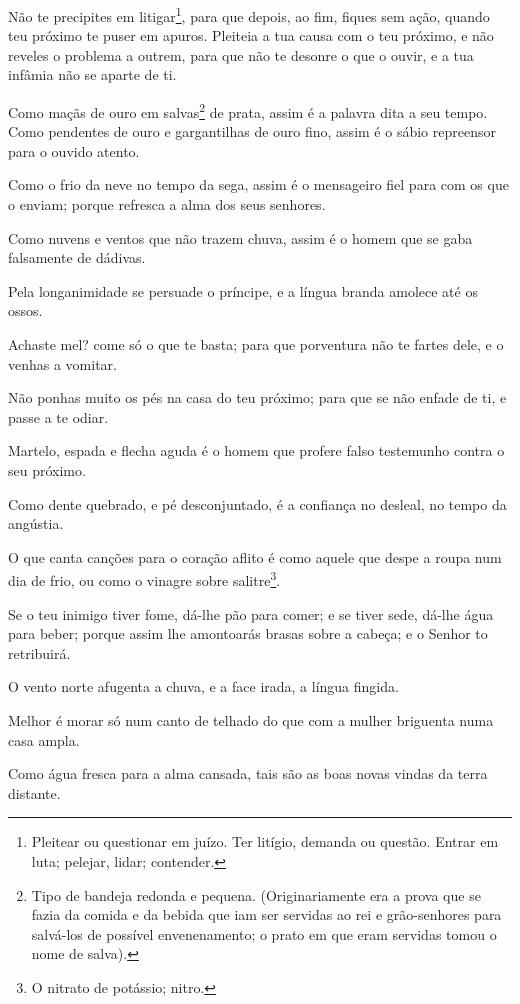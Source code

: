Não te precipites em litigar\footnote{Pleitear ou questionar em
juízo. Ter litígio, demanda ou questão. Entrar em luta; pelejar,
lidar; contender.}, para que depois, ao fim, fiques sem ação, quando
teu próximo te puser em apuros. Pleiteia a tua causa com o teu
próximo, e não reveles o problema a outrem, para que não te
desonre o que o ouvir, e a tua infâmia não se aparte de ti.

Como maçãs de ouro em salvas\footnote{Tipo de bandeja redonda e
pequena. (Originariamente era a prova que se fazia da comida e da
bebida que iam ser servidas ao rei e grão-senhores para salvá-los de
possível envenenamento; o prato em que eram servidas tomou o nome de
salva).} de prata, assim é a palavra dita a seu tempo. Como
pendentes de ouro e gargantilhas de ouro fino, assim é o sábio
repreensor para o ouvido atento.

Como o frio da neve no tempo da sega, assim é o mensageiro fiel
para com os que o enviam; porque refresca a alma dos seus senhores.

Como nuvens e ventos que não trazem chuva, assim é o homem que se
gaba falsamente de dádivas.

Pela longanimidade se persuade o príncipe, e a língua branda
amolece até os ossos.

Achaste mel? come só o que te basta; para que porventura não te
fartes dele, e o venhas a vomitar.

Não ponhas muito os pés na casa do teu próximo; para que se não
enfade de ti, e passe a te odiar.

Martelo, espada e flecha aguda é o homem que profere falso
testemunho contra o seu próximo.

Como dente quebrado, e pé desconjuntado, é a confiança no
desleal, no tempo da angústia.

O que canta canções para o coração aflito é como aquele que despe
a roupa num dia de frio, ou como o vinagre sobre salitre\footnote{O
nitrato de potássio; nitro.}.

Se o teu inimigo tiver fome, dá-lhe pão para comer; e se tiver
sede, dá-lhe água para beber; porque assim lhe amontoarás
brasas sobre a cabeça; e o Senhor to retribuirá.

O vento norte afugenta a chuva, e a face irada, a língua fingida.

Melhor é morar só num canto de telhado do que com a mulher
briguenta numa casa ampla.

Como água fresca para a alma cansada, tais são as boas novas
vindas da terra distante.

